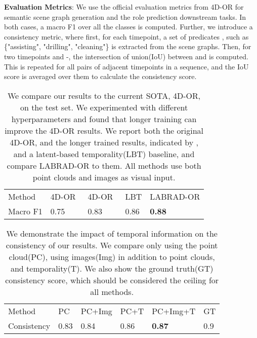 \documentclass[runningheads]{llncs}
\begin{document}
\noindent \textbf{Evaluation Metrics}: We use the official evaluation metrics from 4D-OR for semantic scene graph generation and the role prediction downstream tasks. In both cases, a macro F1 over all the classes is computed. Further, we introduce a consistency metric, where first, for each timepoint, a set of predicates , such as \{"assisting", "drilling", "cleaning"\} is extracted from the scene graphs. Then, for two timepoints  and -, the intersection of union(IoU) between  and  is computed. This is repeated for all pairs of adjacent timepoints in a sequence, and the IoU score is averaged over them to calculate the consistency score. 

\begin{table}[t]
    \centering
    \caption{We compare our results to the current SOTA, 4D-OR, on the test set. We experimented with different hyperparameters and found that longer training can improve the 4D-OR results. We report both the original 4D-OR, and the longer trained results, indicated by , and a latent-based temporality(LBT) baseline, and compare LABRAD-OR to them. All methods use both point clouds and images as visual input.}
    \begin{tabu} to 0.9\textwidth { X[c] | X[c] X[c] X[c] X[c]}
    \toprule
     Method & 4D-OR~\cite{ozsoy20224d} & 4D-OR~\cite{ozsoy20224d} & LBT & LABRAD-OR \\ 
        \cmidrule(){1-5}
		 Macro F1 & 0.75 & 0.83 & 0.86 & \textbf{0.88}  \\
   \bottomrule
   \end{tabu}
    \label{tab:sota_comparison}
\end{table}

\begin{table}[t]
    \centering
    \caption{We demonstrate the impact of temporal information on the consistency of our results. We compare only using the point cloud(PC), using images(Img) in addition to point clouds, and temporality(T). We also show the ground truth(GT) consistency score, which should be considered the ceiling for all methods.}
    \begin{tabu} to 0.95\textwidth { X[c] | X[c] X[c] X[c] X[c] | X[c]}
    \toprule
     Method & PC & PC+Img & PC+T & PC+Img+T & GT \\ 
        \cmidrule(){1-6}
		 Consistency & 0.83 & 0.84 & 0.86 & \textbf{0.87} & 0.9 \\
    \bottomrule
   \end{tabu}
    \label{tab:consistency_comparison}
\end{table}
\end{document}
